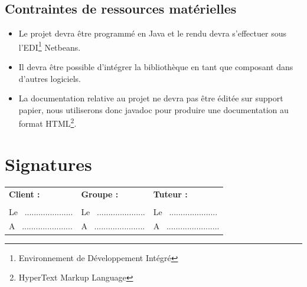 \documentclass[12pt,a4paper,openany]{article}
\begin{document}
	\subsection{Contraintes de ressources matérielles}
	\begin{itemize}
		\item Le projet devra être programmé en Java et le rendu devra s'effectuer sous l'EDI\footnote{Environnement de Développement Intégré} Netbeans. 
		\item Il devra être possible d'intégrer la bibliothèque en tant que composant dans d'autres logiciels. 
		\item La documentation relative au projet ne devra pas être éditée sur support papier, nous utili\-serons donc javadoc pour produire une documentation 
			au format HTML\footnote{HyperText Markup Language}.  
	\end{itemize}
	

\section*{Signatures}
\vspace{20px}
\begin{tabular}[center]{p{175px}p{175px}p{175px}}
  \textbf{Client :} & \textbf{Groupe :} & \textbf{Tuteur :} \\
  \\
  Le ~..................... & Le ~..................... & Le ~..................... \\
  A ~...................... & A ~...................... & A ~....................... \\
\end{tabular}
\newpage
\appendix
\end{document}
